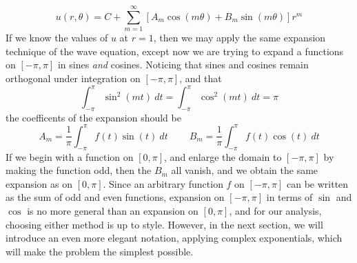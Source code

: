 %
\[ u(r,\theta) = C + \sum_{m = 1}^\infty [A_m \cos(m \theta) + B_m \sin(m \theta)] r^m \]
%
If we know the values of $u$ at $r = 1$, then we may apply the same expansion technique of the wave equation, except now we are trying to expand a functions on $[-\pi,\pi]$ in sines {\it and} cosines. Noticing that sines and cosines remain orthogonal under integration on $[-\pi,\pi]$, and that
%
\[ \int_{-\pi}^\pi \sin^2(mt)\ dt = \int_{-\pi}^\pi \cos^2(mt)\ dt = \pi \]
%
the coefficents of the expansion should be
%
\[ A_m = \frac{1}{\pi} \int_{-\pi}^\pi f(t) \sin(t)\ dt\ \ \ \ \ \ \ \ \ \ B_m = \frac{1}{\pi} \int_{-\pi}^\pi f(t) \cos(t)\ dt \]
%
If we begin with a function on $[0,\pi]$, and enlarge the domain to $[-\pi,\pi]$ by making the function odd, then the $B_m$ all vanish, and we obtain the same expansion as on $[0,\pi]$. Since an arbitrary function $f$ on $[-\pi,\pi]$ can be written as the sum of odd and even functions, expansion on $[-\pi,\pi]$ in terms of $\sin$ and $\cos$ is no more general than an expansion on $[0,\pi]$, and for our analysis, choosing either method is up to style. However, in the next section, we will introduce an even more elegant notation, applying complex exponentials, which will make the problem the simplest possible.


